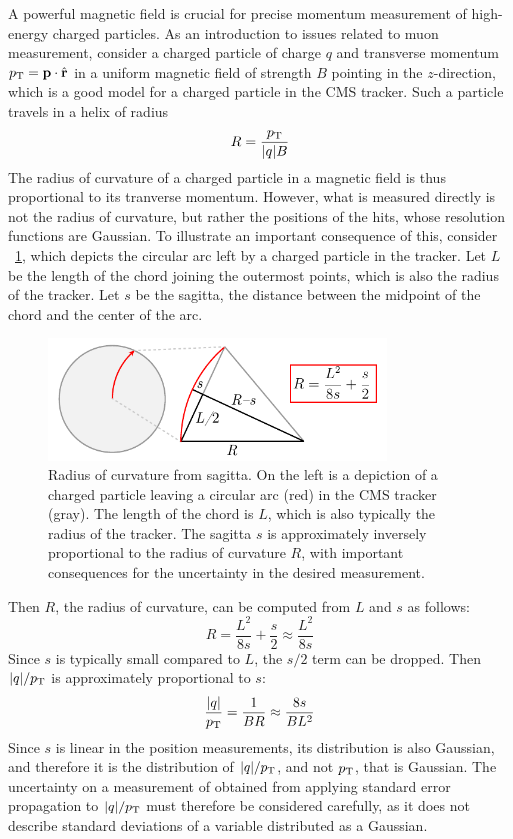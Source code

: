 A powerful magnetic field is crucial for precise momentum measurement of high-energy charged particles.
As an introduction to issues related to muon \pT measurement, consider a charged particle of charge $q$ and transverse momentum $p_{\mathrm{T}} = \mathbf{p} \cdot \hat{\mathbf{r}}$ in a uniform magnetic field of strength $B$ pointing in the $z$-direction, which is a good model for a charged particle in the CMS tracker. Such a particle travels in a helix of radius
\begin{equation}
  R = \frac{p_{\mathrm{T}}}{|q|B}
  \label{cms:radius}
\end{equation}
The radius of curvature of a charged particle in a magnetic field is thus proportional to its tranverse momentum.
However, what is measured directly is not the radius of curvature, but rather the positions of the hits, whose resolution functions are Gaussian.
To illustrate an important consequence of this, consider \Fig~\ref{cms:sagitta}, which depicts the circular arc left by a charged particle in the tracker.
Let $L$ be the length of the chord joining the outermost points, which is also the radius of the tracker.
Let $s$ be the sagitta, \ie the distance between the midpoint of the chord and the center of the arc.
\begin{figure}[tpb]
  \centering
  \includegraphics[width=0.8\textwidth]{figures/cms/Sagitta.pdf}
  \caption{Radius of curvature from sagitta. On the left is a depiction of a charged particle leaving a circular arc (red) in the CMS tracker (gray). The length of the chord is $L$, which is also typically the radius of the tracker. The sagitta $s$ is approximately inversely proportional to the radius of curvature $R$, with important consequences for the uncertainty in the desired \pT measurement.}
  \label{cms:sagitta}
\end{figure}
Then $R$, the radius of curvature, can be computed from $L$ and $s$ as follows:
\begin{equation}
  R = \frac{L^2}{8s} + \frac{s}{2} \approx \frac{L^2}{8s}
  \label{cms:eqn_sagitta}
\end{equation}
Since $s$ is typically small compared to $L$, the $s/2$ term can be dropped.
Then $|q|/p_{\mathrm{T}}$ is approximately proportional to $s$:
\begin{align}
  \frac{|q|}{p_{\mathrm{T}}} = \frac{1}{BR} \approx \frac{8s}{BL^2}
  \label{cms:pTError}
\end{align}
Since $s$ is linear in the position measurements, its distribution is also Gaussian, and therefore it is the distribution of $|q|/p_{\mathrm{T}}$, and not $p_{\mathrm{T}}$, that is Gaussian.
The uncertainty on a measurement of \pT obtained from applying standard error propagation to $|q|/p_{\mathrm{T}}$ must therefore be considered carefully, as it does not describe standard deviations of a variable distributed as a Gaussian.

